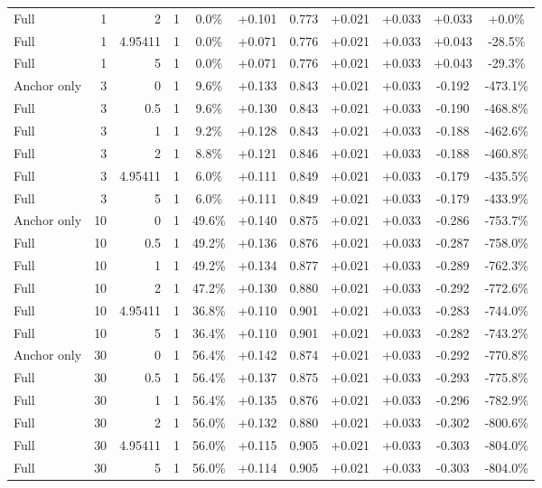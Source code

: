 \begin{table}[htbp]
\begin{tabular}{lrrrccccccc}
Full & 1 & 2 & 1 & 0.0\% & +0.101 & 0.773 & +0.021 & +0.033 & +0.033 & +0.0\% \\
Full & 1 & 4.95411 & 1 & 0.0\% & +0.071 & 0.776 & +0.021 & +0.033 & +0.043 & -28.5\% \\
Full & 1 & 5 & 1 & 0.0\% & +0.071 & 0.776 & +0.021 & +0.033 & +0.043 & -29.3\% \\
Anchor only & 3 & 0 & 1 & 9.6\% & +0.133 & 0.843 & +0.021 & +0.033 & -0.192 & -473.1\% \\
Full & 3 & 0.5 & 1 & 9.6\% & +0.130 & 0.843 & +0.021 & +0.033 & -0.190 & -468.8\% \\
Full & 3 & 1 & 1 & 9.2\% & +0.128 & 0.843 & +0.021 & +0.033 & -0.188 & -462.6\% \\
Full & 3 & 2 & 1 & 8.8\% & +0.121 & 0.846 & +0.021 & +0.033 & -0.188 & -460.8\% \\
Full & 3 & 4.95411 & 1 & 6.0\% & +0.111 & 0.849 & +0.021 & +0.033 & -0.179 & -435.5\% \\
Full & 3 & 5 & 1 & 6.0\% & +0.111 & 0.849 & +0.021 & +0.033 & -0.179 & -433.9\% \\
Anchor only & 10 & 0 & 1 & 49.6\% & +0.140 & 0.875 & +0.021 & +0.033 & -0.286 & -753.7\% \\
Full & 10 & 0.5 & 1 & 49.2\% & +0.136 & 0.876 & +0.021 & +0.033 & -0.287 & -758.0\% \\
Full & 10 & 1 & 1 & 49.2\% & +0.134 & 0.877 & +0.021 & +0.033 & -0.289 & -762.3\% \\
Full & 10 & 2 & 1 & 47.2\% & +0.130 & 0.880 & +0.021 & +0.033 & -0.292 & -772.6\% \\
Full & 10 & 4.95411 & 1 & 36.8\% & +0.110 & 0.901 & +0.021 & +0.033 & -0.283 & -744.0\% \\
Full & 10 & 5 & 1 & 36.4\% & +0.110 & 0.901 & +0.021 & +0.033 & -0.282 & -743.2\% \\
Anchor only & 30 & 0 & 1 & 56.4\% & +0.142 & 0.874 & +0.021 & +0.033 & -0.292 & -770.8\% \\
Full & 30 & 0.5 & 1 & 56.4\% & +0.137 & 0.875 & +0.021 & +0.033 & -0.293 & -775.8\% \\
Full & 30 & 1 & 1 & 56.4\% & +0.135 & 0.876 & +0.021 & +0.033 & -0.296 & -782.9\% \\
Full & 30 & 2 & 1 & 56.0\% & +0.132 & 0.880 & +0.021 & +0.033 & -0.302 & -800.6\% \\
Full & 30 & 4.95411 & 1 & 56.0\% & +0.115 & 0.905 & +0.021 & +0.033 & -0.303 & -804.0\% \\
Full & 30 & 5 & 1 & 56.0\% & +0.114 & 0.905 & +0.021 & +0.033 & -0.303 & -804.0\% \\

\end{tabular}
\end{table}
